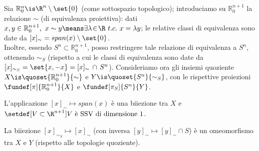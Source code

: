 

\newcommand*\Ps{\mathbb{P}} %
\newcommand*\Ro[1][n]{\mathbb{R}_0^{#1}} %
\newcommand*\tc{\ t.c. \ } %

Sia $\Ro \is \R^n \setminus \set{0}$ (come sottospazio topologico); introduciamo su $\Ro[n+1]$ la relazione $\sim $ (di equivalenza proiettiva): dati $x, y \in \Ro[n+1], \ x \sim y \means  \exists \lambda \! \in \! \R \tc x = \lambda y $; le relative classi di equivalenza sono date da $[x]_\sim = span(x) \setminus \set{0}$. \\
Inoltre, essendo $S^n \subset \Ro[n+1]$, posso restringere tale relazione di equivalenza a $S^n$, ottenendo $\sim_S$ (rispetto a cui le classi di equivalenza sono date da $[x]_{\sim_S} = \set{x, -x} = [x]_\sim \, \cap \, S^n$).
Consideriamo ora gli insiemi quoziente $X \is \quoset{\Ro[n+1]}{\sim}$ e $Y \is \quoset{S^n}{\sim_S}$, con le rispettive proiezioni $\fundef[\pi]{\Ro[n+1]}{X}$ e $\fundef[\pi_S]{S^n}{Y}$.

\begin{oss}
	L'applicazione $[x]_\sim \! \mapsto \! span(x)$ è una biiezione tra $X$ e \break
	$\setdef[V \subset \R^{n+1}]{V \text{ è SSV di dimensione 1}}$.
\end{oss}

\begin{prop}
	La biiezione $[x]_{\sim_S} \! \mapsto \! [x]_\sim$ (con inversa $[y]_\sim \! \mapsto \! [y]_\sim \cap S$) è un omeomorfismo tra $X$ e $Y$ (rispetto alle topologie quoziente).
\end{prop}
